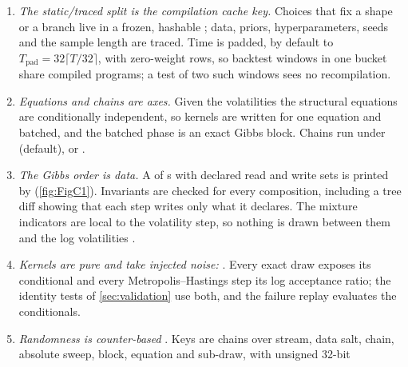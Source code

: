 \begin{enumerate}[leftmargin=*,itemsep=2pt,topsep=4pt]
  \item \emph{The static/traced split is the compilation cache key.} Choices that fix a shape or a
    branch live in a frozen, hashable ; data, priors, hyperparameters, seeds and
    the sample length are traced. Time is padded, by default to $T_{\mathrm{pad}} = 32\lceil T/32\rceil$, with
    zero-weight rows, so backtest windows in one bucket share compiled programs; a test of two such
    windows sees no recompilation. %
  \item \emph{Equations and chains are  axes.} Given the volatilities the structural
    equations are conditionally independent, so kernels are written for one equation and batched,
    and the batched phase is an exact Gibbs block. Chains run under  (default),
     or .
  \item \emph{The Gibbs order is data.} A  of s with declared read and write sets
    is printed by  (\cref{fig:FigC1}). Invariants are checked for every
    composition, including a tree diff showing that each step writes only what it declares. The mixture
    indicators are local to the volatility step, so nothing is drawn between them and the log
    volatilities \citep{delnegro2015time}. %
  \item \emph{Kernels are pure and take injected noise:} .
    Every exact draw exposes its conditional and every Metropolis--Hastings step its log acceptance
    ratio; the identity tests of \cref{sec:validation} use both, and the failure replay
    evaluates the conditionals. %
  \item \emph{Randomness is counter-based} \citep{salmon2011parallel}. Keys are  chains
    over stream, data salt, chain, absolute sweep, block, equation and sub-draw, with unsigned 32-bit

\end{enumerate}
